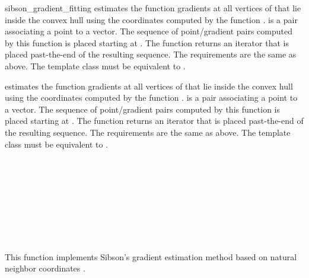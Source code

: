 \begin{ccRefFunction}{sibson_gradient_fitting}
{estimates the function gradients at all vertices of  that lie
  inside the convex hull using the coordinates computed by the
  function .
   is a pair associating a point to a
  vector. The sequence of point/gradient pairs computed by this
  function is placed starting at . The function returns an
  iterator that is placed past-the-end of the resulting sequence. The
  requirements are the same as above. The template class  must
  be equivalent to .}

{estimates the function gradients at all vertices of  that lie
  inside the convex hull using the coordinates computed by the
  function .
   is a pair associating a point to a
  vector. The sequence of point/gradient pairs computed by this
  function is placed starting at . The function returns an
  iterator that is placed past-the-end of the resulting sequence. The
  requirements are the same as above. The template class  must
  be equivalent to .}


\ccSeeAlso
{} \\
 \\
 \\
 \\
 \\
\\
 \\
\\

\ccImplementation This function implements Sibson's gradient
estimation method based on natural neighbor coordinates
\cite{s-bdnni-81}. 

\end{ccRefFunction}
